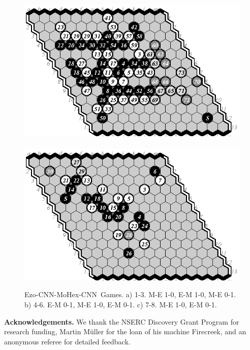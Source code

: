 \documentclass{IOS-Book-Article}
\def\Ec{\mbox{\sc Ezo-CNN}}
\def\Mc{\mbox{\sc MoHex-CNN}}
\begin{document}
\begin{figure}
\noindent\hspace*{-.4cm}\
\includegraphics[scale=.9]{pix/13.me7plus.eps}\hspace*{-1.8cm}\
\includegraphics[scale=.9]{pix/13.em8plus.eps}
\caption{\Ec{}-\Mc\ Games. 
a) 1-3. M-E 1-0, E-M 1-0, M-E 0-1.
b) 4-6. E-M 0-1, M-E 1-0, E-M 0-1.
c) 7-8. M-E 1-0, E-M 0-1.}
\label{fig:EM13}
\end{figure}
\fi

{\bf Acknowledgements.}
We thank the NSERC Discovery Grant Program for research funding,
Martin M\"{u}ller for the loan of his machine Firecreek, and
an anonymous referee for detailed feedback.


\end{document}
